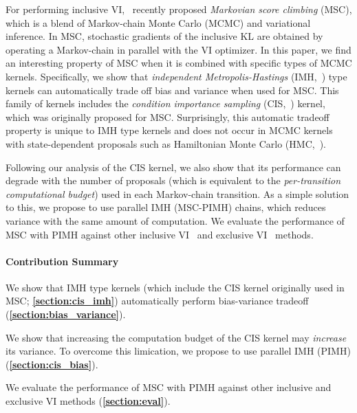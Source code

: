 For performing inclusive VI,~\citet{NEURIPS2020_b2070693, pmlr-v124-ou20a} recently proposed \textit{Markovian score climbing} (MSC), which is a blend of Markov-chain Monte Carlo (MCMC) and variational inference.
In MSC, stochastic gradients of the inclusive KL are obtained by operating a Markov-chain in parallel with the VI optimizer.
In this paper, we find an interesting property of MSC when it is combined with specific types of MCMC kernels.
Specifically, we show that \textit{independent Metropolis-Hastings} (IMH,~\citealt{robert_monte_2004}) type kernels can automatically trade off bias and variance when used for MSC.
This family of kernels includes the \textit{condition importance sampling} (CIS,~\citealt{NEURIPS2020_b2070693}) kernel, which was originally proposed for MSC.
Surprisingly, this automatic tradeoff property is unique to IMH type kernels and does not occur in MCMC kernels with state-dependent proposals such as Hamiltonian Monte Carlo (HMC,~\citealt{duane_hybrid_1987, neal_mcmc_2011, betancourt_conceptual_2017}).

Following our analysis of the CIS kernel, we also show that its performance can degrade with the number of proposals (which is equivalent to the \textit{per-transition computational budget}) used in each Markov-chain transition.
As a simple solution to this, we propose to use parallel IMH (MSC-PIMH) chains, which reduces variance with the same amount of computation.
We evaluate the performance of MSC with PIMH against other inclusive VI~\citep{DBLP:journals/corr/BornscheinB14, NEURIPS2020_b2070693} and exclusive VI~\citep{pmlr-v33-ranganath14, JMLR:v18:16-107} methods.

\vspace{-0.1in}
\paragraph{Contribution Summary}
\begin{enumerate*}[label=\textbf{(\roman*)}]
\item We show that IMH type kernels (which include the CIS kernel originally used in MSC; \textbf{\cref{section:cis_imh}}) automatically perform bias-variance tradeoff (\textbf{\cref{section:bias_variance}}).
\item We show that increasing the computation budget of the CIS kernel may \textit{increase} its variance.
  To overcome this limication, we propose to use parallel IMH (PIMH) (\textbf{\cref{section:cis_bias}}).
\item We evaluate the performance of MSC with PIMH against other inclusive and exclusive VI methods (\textbf{\cref{section:eval}}).
\end{enumerate*}

